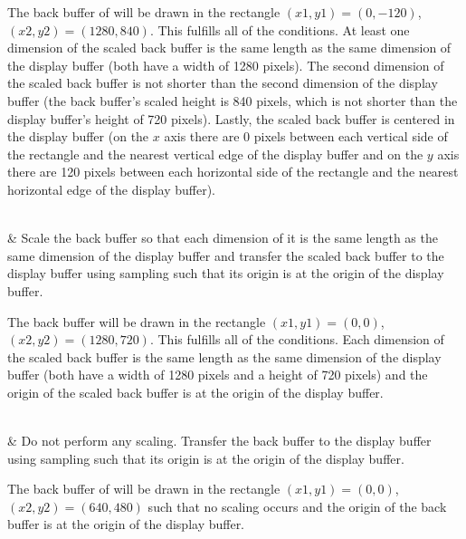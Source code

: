 \begin{libreqtab2}
 \begin{example}
 The back buffer of  will be drawn in the rectangle $(x1,y1) = (0,-120)$, $(x2,y2) = (1280,840)$. This fulfills all of the conditions. At least one dimension of the scaled back buffer is the same length as the same dimension of the display buffer (both have a width of 1280 pixels). The second dimension of the scaled back buffer is not shorter than the second dimension of the display buffer (the back buffer's scaled height is 840 pixels, which is not shorter than the display buffer's height of 720 pixels). Lastly, the scaled back buffer is centered in the display buffer (on the $x$ axis there are 0 pixels between each vertical side of the rectangle and the nearest vertical edge of the display buffer and on the $y$ axis there are 120 pixels between each horizontal side of the rectangle and the nearest horizontal edge of the display buffer).
 \end{example} 
 \\
 & Scale the back buffer so that each dimension of it is the same length as the same dimension of the display buffer and transfer the scaled back buffer to the display buffer using sampling such that its origin is at the origin of the display buffer.
 
 \begin{example}
 The back buffer will be drawn in the rectangle $(x1,y1) = (0,0)$, $(x2,y2) = (1280,720)$. This fulfills all of the conditions. Each dimension of the scaled back buffer is the same length as the same dimension of the display buffer (both have a width of 1280 pixels and a height of 720 pixels) and the origin of the scaled back buffer is at the origin of the display buffer.
 \end{example}
 \\
 & Do not perform any scaling. Transfer the back buffer to the display buffer using sampling such that its origin is at the origin of the display buffer.
 
 \begin{example}
 The back buffer of  will be drawn in the rectangle $(x1,y1) = (0,0)$, $(x2,y2) = (640,480)$ such that no scaling occurs and the origin of the back buffer is at the origin of the display buffer.
 \end{example}
 \\
\end{libreqtab2}
